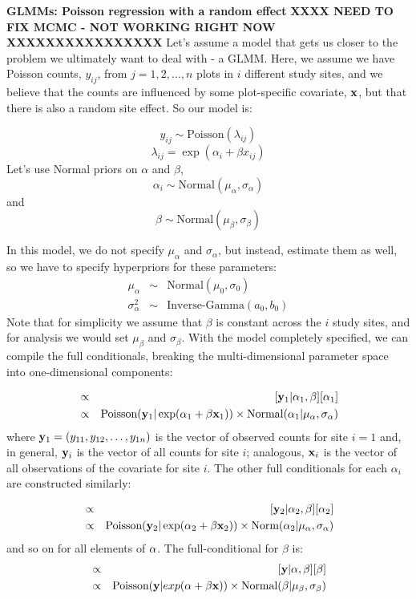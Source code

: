 {\flushleft \bf  GLMMs: Poisson regression with a random effect }
{\bf XXXX NEED TO FIX MCMC - NOT WORKING RIGHT NOW XXXXXXXXXXXXXXXX}
Let's assume a model that gets us closer to the problem we ultimately
want to deal with - a GLMM. Here, we assume we have Poisson counts,
$y_{ij}$, from $j=1,2,\ldots,n$ plots in $i$ different study sites,
and we believe that the counts are influenced by some plot-specific
covariate, ${\bf x}$, but that there is also a random site effect. So
our model is:

\[
y_{ij} \sim \mbox{Poisson}(\lambda_{ij})
\]
\[
\lambda_{ij} = \exp (\alpha_i + \beta x_{ij})
\]
Let's use Normal priors on $\alpha$ and $\beta$,  \[
\alpha_i \sim \mbox{Normal} (\mu_{\alpha}, \sigma_{\alpha})
\]
and
\[
\beta \sim \mbox{Normal} (\mu_{\beta}, \sigma_{\beta})
\]

In this model, we do not specify $\mu_{\alpha}$ and $\sigma_{\alpha}$, but instead, estimate them as well, so we have
to specify hyperpriors for these parameters:
\begin{eqnarray*}
\mu_{\alpha}  &\sim &  \mbox{Normal}(\mu_0, \sigma_0)  \\
\sigma_{\alpha}^2 & \sim & \mbox{Inverse-Gamma}(a_0, b_0)
\end{eqnarray*}
Note that for simplicity we assume that $\beta$ is constant across the $i$ study sites, and for analysis we would set $\mu_{\beta}$ and $\sigma_{\beta}$.
With the model completely specified, we can compile the full conditionals,
breaking the multi-dimensional parameter space into one-dimensional
components:

\begin{eqnarray*}
[\alpha_1|\alpha_2,\alpha_3,\ldots,\alpha_i,\beta,{\bf y}_{1}] & \propto &   [{\bf y}_{1}|\alpha_1,\beta]  [\alpha_1] \\
	 & \propto  &   \mbox{Poisson}({\bf y}_{1}| \exp(\alpha_1 + \beta {\bf x}_1)) \times \mbox{Normal}(\alpha_1|\mu_{\alpha} , \sigma_{\alpha})
\end{eqnarray*}
where ${\bf y}_{1} = (y_{11},y_{12}, \ldots, y_{1n})$ is the vector of
observed counts for site $i=1$ and, in general, ${\bf y}_{i}$ is the
vector of all counts for site $i$; analogous, ${\bf x}_{i}$ is the
vector of all observations of the covariate for site $i$. The other full conditionals for
each $\alpha_{i}$ are constructed similarly:

\begin{eqnarray*}
[\alpha_2|\alpha_1,\alpha_3,\ldots,\alpha_i,\beta,{\bf y}_{2}] & \propto&  [{\bf y}_{2}|\alpha_2,\beta]  [\alpha_2] \\
	 & \propto  & \mbox{Poisson}({\bf y}_{2}| \exp(\alpha_2 + \beta {\bf x}_2)) \times \mbox{Norm}(\alpha_2|\mu_{\alpha}, \sigma_{\alpha})
\end{eqnarray*}
and so on for all elements of ${\bf \alpha}$. The full-conditional for $\beta$ is:
\begin{eqnarray*}
[\beta|{\bf \alpha},{\bf y}] &\propto & [{\bf y}|{\bf \alpha},\beta]  [\beta] \\
	 &\propto& \mbox{Poisson}({\bf y}|exp({\bf \alpha} + \beta {\bf x})) \times \mbox{Normal}(\beta|\mu_{\beta}, \sigma_{\beta})
\end{eqnarray*}

